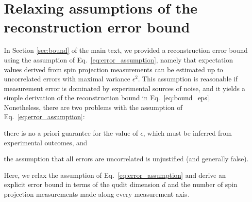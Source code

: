 \documentclass[notitlepage,twocolumn]{revtex4-2}
\begin{document}
\section{Relaxing assumptions of the reconstruction error bound}
\label{sec:error}

In Section \ref{sec:bound} of the main text, we provided a reconstruction error bound using the assumption of Eq.~\eqref{eq:error_assumption}, namely that expectation values derived from spin projection measurements can be estimated up to uncorrelated errors with maximal variance $\epsilon^2$.
This assumption is reasonable if measurement error is dominated by experimental sources of noise, and it yields a simple derivation of the reconstruction bound in Eq.~\eqref{eq:bound_eps}.
Nonetheless, there are two problems with the assumption of Eq.~\eqref{eq:error_assumption}:
\begin{enumerate*}
\item there is no a priori guarantee for the value of $\epsilon$, which must be inferred from experimental outcomes, and
\item the assumption that all errors are uncorrelated is unjustified (and generally false).
\end{enumerate*}
Here, we relax the assumption of Eq.~\eqref{eq:error_assumption} and derive an explicit error bound in terms of the qudit dimension $d$ and the number of spin projection measurements made along every measurement axis.
\end{document}
